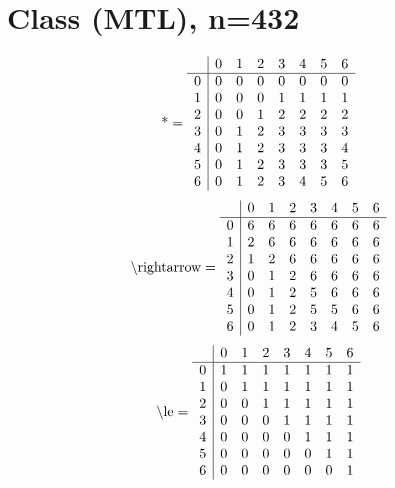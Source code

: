\documentclass[11pt]{article}
\begin{document}
\section{Class (MTL), n=432}
\[\text{*} = 
\begin{array}{r | r r r r r r r}
 & 0 & 1 & 2 & 3 & 4 & 5 & 6 \\ \hline
0 & 0 & 0 & 0 & 0 & 0 & 0 & 0 \\
1 & 0 & 0 & 0 & 1 & 1 & 1 & 1 \\
2 & 0 & 0 & 1 & 2 & 2 & 2 & 2 \\
3 & 0 & 1 & 2 & 3 & 3 & 3 & 3 \\
4 & 0 & 1 & 2 & 3 & 3 & 3 & 4 \\
5 & 0 & 1 & 2 & 3 & 3 & 3 & 5 \\
6 & 0 & 1 & 2 & 3 & 4 & 5 & 6 \\
\end{array}
\]
\[\text{\textbackslash rightarrow} = 
\begin{array}{r | r r r r r r r}
 & 0 & 1 & 2 & 3 & 4 & 5 & 6 \\ \hline
0 & 6 & 6 & 6 & 6 & 6 & 6 & 6 \\
1 & 2 & 6 & 6 & 6 & 6 & 6 & 6 \\
2 & 1 & 2 & 6 & 6 & 6 & 6 & 6 \\
3 & 0 & 1 & 2 & 6 & 6 & 6 & 6 \\
4 & 0 & 1 & 2 & 5 & 6 & 6 & 6 \\
5 & 0 & 1 & 2 & 5 & 5 & 6 & 6 \\
6 & 0 & 1 & 2 & 3 & 4 & 5 & 6 \\
\end{array}
\]
\[\text{\textbackslash le} = 
\begin{array}{r | r r r r r r r}
 & 0 & 1 & 2 & 3 & 4 & 5 & 6 \\ \hline
0 & 1 & 1 & 1 & 1 & 1 & 1 & 1 \\
1 & 0 & 1 & 1 & 1 & 1 & 1 & 1 \\
2 & 0 & 0 & 1 & 1 & 1 & 1 & 1 \\
3 & 0 & 0 & 0 & 1 & 1 & 1 & 1 \\
4 & 0 & 0 & 0 & 0 & 1 & 1 & 1 \\
5 & 0 & 0 & 0 & 0 & 0 & 1 & 1 \\
6 & 0 & 0 & 0 & 0 & 0 & 0 & 1 \\
\end{array}
\]
\end{document}
